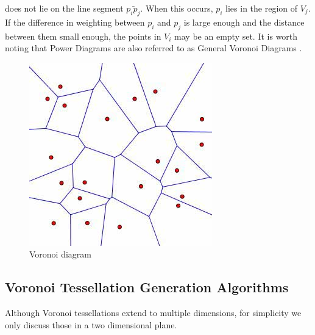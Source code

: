 %
does not lie on the line segment $\bar{p_ip_j}$. When this occurs, $p_i$ lies in the region of $V_j$. If the difference in weighting between $p_i$ and $p_j$ is large enough and the distance between them small enough, the points in $V_i$ may be an empty set. It is worth noting that Power Diagrams are also referred to as General Voronoi Diagrams \citep{aurenhammer1987power}.
%
\begin{figure}[H]
    \centering
    \includegraphics[scale=0.65]{Images/voronoi.jpg}
    \caption[]{Voronoi diagram\footnotemark}
    \label{tes:fig:voreg}
\end{figure}
\subsection{Voronoi Tessellation Generation Algorithms}\label{tes:sec:tga}
Although Voronoi tessellations extend to multiple dimensions, for simplicity we only discuss those in a two dimensional plane.
%
